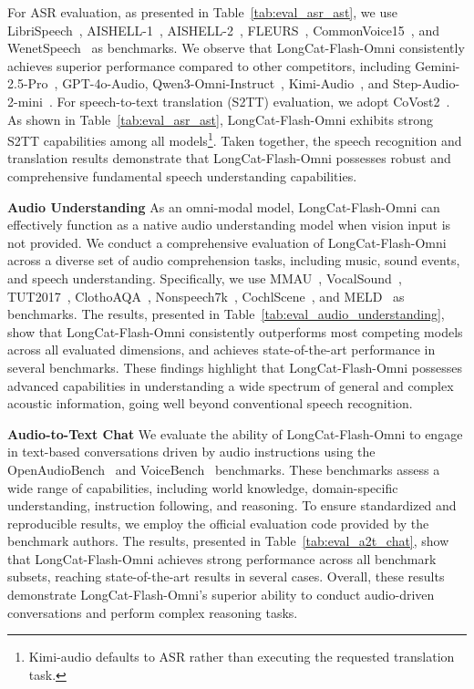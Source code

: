 \documentclass{article}
\newcommand{\longcat}{LongCat-Flash-Omni\xspace}
\begin{document}
For ASR evaluation, as presented in Table~\ref{tab:eval_asr_ast}, we use LibriSpeech~\citep{panayotov2015librispeech}, AISHELL-1~\citep{bu2017aishell}, AISHELL-2~\citep{du2018aishell}, FLEURS~\citep{conneau2023fleurs}, CommonVoice15~\citep{ardila2019common}, and WenetSpeech~\citep{zhang2022wenetspeech} as benchmarks. We observe that \longcat consistently achieves superior performance compared to other competitors, including Gemini-2.5-Pro~\citep{comanici2025gemini}, GPT-4o-Audio, Qwen3-Omni-Instruct~\citep{xu2025qwen3}, Kimi-Audio~\citep{ding2025kimi}, and Step-Audio-2-mini~\citep{wu2025step}.
For speech-to-text translation (S2TT) evaluation, we adopt CoVost2~\citep{wang2021covost}. As shown in Table~\ref{tab:eval_asr_ast}, \longcat exhibits strong S2TT capabilities among all models\footnote{Kimi-audio defaults to ASR rather than executing the requested translation task.}. Taken together, the speech recognition and translation results demonstrate that LongCat-Flash-Omni possesses robust and comprehensive fundamental speech understanding capabilities.

\textbf{Audio Understanding}
As an omni-modal model, \longcat can effectively function as a native audio understanding model when vision input is not provided. We conduct a comprehensive evaluation of \longcat across a diverse set of audio comprehension tasks, including music, sound events, and speech understanding. Specifically, we use MMAU~\citep{sakshi2024mmau}, VocalSound~\citep{gong_vocalsound}, TUT2017~\citep{Mesaros2016_EUSIPCO}, ClothoAQA~\citep{lipping2022clotho}, Nonspeech7k~\citep{rashid2023nonspeech7k}, CochlScene~\citep{jeong2022cochlscene}, and MELD~\citep{poria2018meld} as benchmarks.
The results, presented in Table~\ref{tab:eval_audio_understanding}, show that \longcat consistently outperforms most competing models across all evaluated dimensions, and achieves state-of-the-art performance in several benchmarks. These findings highlight that \longcat possesses advanced capabilities in understanding a wide spectrum of general and complex acoustic information, going well beyond conventional speech recognition.

\textbf{Audio-to-Text Chat} We evaluate the ability of \longcat to engage in text-based conversations driven by audio instructions using the OpenAudioBench~\citep{li2025baichuan} and VoiceBench~\citep{chen2024voicebench} benchmarks. These benchmarks assess a wide range of capabilities, including world knowledge, domain-specific understanding, instruction following, and reasoning.
To ensure standardized and reproducible results, we employ the official evaluation code provided by the benchmark authors. The results, presented in Table~\ref{tab:eval_a2t_chat}, show that \longcat achieves strong performance across all benchmark subsets, reaching state-of-the-art results in several cases. Overall, these results demonstrate \longcat’s superior ability to conduct audio-driven conversations and perform complex reasoning tasks.
\end{document}
